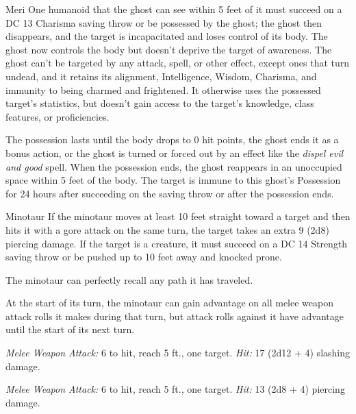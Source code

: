 \documentclass[10pt,a4paper,twoside,bg=print,twocolumn,openany,nodeprecatedcode]{dndbook}
\begin{document}
\begin{DndMonster}[float=t]{Meri}
One humanoid that the ghost can see within 5 feet of it must succeed on a DC 13 Charisma saving throw or be possessed by the ghost; the ghost then disappears, and the target is incapacitated and loses control of its body. The ghost now controls the body but doesn't deprive the target of awareness. The ghost can't be targeted by any attack, spell, or other effect, except ones that turn undead, and it retains its alignment, Intelligence, Wisdom, Charisma, and immunity to being charmed and frightened. It otherwise uses the possessed target's statistics, but doesn't gain access to the target's knowledge, class features, or proficiencies.

The possession lasts until the body drops to 0 hit points, the ghost ends it as a bonus action, or the ghost is turned or forced out by an effect like the \textit{dispel evil and good} spell. When the possession ends, the ghost reappears in an unoccupied space within 5 feet of the body. The target is immune to this ghost's Possession for 24 hours after succeeding on the saving throw or after the possession ends.

\end{DndMonster}



\begin{DndMonster}[float=t]{Minotaur}
\DndMonsterBasics[
armor-class = {14 (natural armor)},
hit-points = {\DndDice{9d10 + 27}},
speed = {40 ft.}
]
\DndMonsterAbilityScores[
 str = 18,
 dex = 11,
 con = 16,
 int = 6,
 wis = 16,
 cha = 9
]
\DndMonsterDetails[
skills = {Perception +7},
senses = {darkvision 60 ft., passive perception 17},
languages = {Abyssal},
challenge = 3,
]
If the minotaur moves at least 10 feet straight toward a target and then hits it with a gore attack on the same turn, the target takes an extra 9 (2d8) piercing damage. If the target is a creature, it must succeed on a DC 14 Strength saving throw or be pushed up to 10 feet away and knocked prone.

The minotaur can perfectly recall any path it has traveled.

At the start of its turn, the minotaur can gain advantage on all melee weapon attack rolls it makes during that turn, but attack rolls against it have advantage until the start of its next turn.

\textsl{Melee Weapon Attack:} 6 to hit, reach 5 ft., one target. \textsl{Hit:} 17 (2d12 + 4) slashing damage.

\textsl{Melee Weapon Attack:} 6 to hit, reach 5 ft., one target. \textsl{Hit:} 13 (2d8 + 4) piercing damage.

\end{DndMonster}
\end{document}
